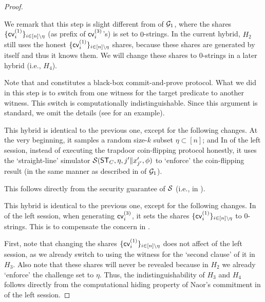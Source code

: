 \begin{proof}
\begin{remark}\label{rmk:known-shares}
We remark that this step is slight different from  of $\mathcal{G}_1$, where the shares $\{\mathsf{cv}^{(1)}_i\}_{i \in [n] \setminus \eta}$ (as prefix of $\mathsf{cv}^{(3)}_i$'s) is set to $0$-strings. In the current hybrid, $H_2$ still uses the honest $\{\mathsf{cv}^{(1)}_i\}_{i \in [n] \setminus \eta}$ shares, because these shares are generated by itself and thus it knows them. We will change these shares to $0$-strings in a later hybrid (i.e., $H_4$). 
\end{remark}

 Note that  and  constitutes a black-box commit-and-prove protocol. What we did in this step is to switch from one witness for the target predicate to another witness. This switch is computationally indistinguishable. Since this argument is standard, we omit the details (see \cite[Section 6.5]{C:CCLY22} for an example).


 This hybrid is identical to the previous one, except for the following changes. At the very beginning, it samples a random size-$k$ subset $\eta\subset [n]$; and In  of the left session, instead of executing the trapdoor coin-flipping protocol honestly, it uses the `straight-line' simulator $\mathcal{S}(\mathsf{ST}_C, \eta, j'\|x'_{j'}, \phi)$ to `enforce' the coin-flipping result (in the same manner as described in  of $\mathcal{G}_1$).

 This follows directly from the security guarantee of $\mathcal{S}$ (i.e.,  in ).

 This hybrid is identical to the previous one, except for the following changes. In  of the left session, when generating $\mathsf{cv}^{(3)}_i$, it sets the shares $\{\mathsf{cv}^{(1)}_i\}_{i \in [n] \setminus \eta}$ to $0$-strings. This is to compensate the concern in . 

 First, note that changing the shares  $\{\mathsf{cv}^{(1)}_i\}_{i \in [n] \setminus \eta}$ does not affect  of the left session, as we already switch to using the witness for the `second clause' of it in $H_3$. Also note that these shares will never be revealed because in $H_2$ we already `enforce' the challenge set to $\eta$. Thus, the indistinguishability of $H_3$ and $H_4$ follows directly from the computational hiding property of Naor's commitment in  of the left session.


\end{proof}
